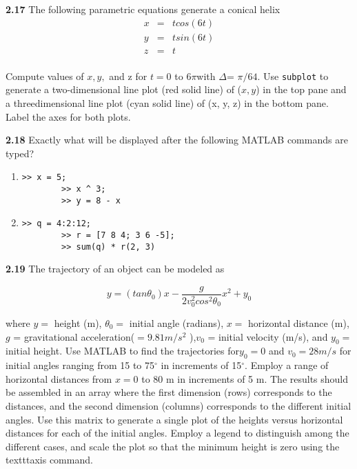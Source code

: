 \documentclass[../main.tex]{subfiles}
\begin{document}
\begin{multicols}{2}
\textbf{2.17} The following parametric equations generate a conical
helix
\[ \begin{array}{lll}
	x &= &t cos(6t)\\
	y &= &t sin(6t)\\
	z &= &t\\

	
\end{array} \]

Compute values of $x, y,$ and z for $t = 0$ to $6\pi $with
$\Delta $= $\pi/64$. Use \texttt{subplot} to generate a two-dimensional
line plot (red solid line) of ($x, y$) in the top pane and a threedimensional line plot (cyan solid line) of (x, y, z) in the
bottom pane. Label the axes for both plots.


\textbf{2.18} Exactly what will be displayed after the following
MATLAB commands are typed?
\begin{enumerate}[label=(\alph*)]
		

	\item 
	\begin{lstlisting}[frame=none, numbers=none]
		>> x = 5;
		>> x ^ 3;
		>> y = 8 - x
	\end{lstlisting}
	\item 
	\begin{lstlisting}[frame=none, numbers=none]
		>> q = 4:2:12;
		>> r = [7 8 4; 3 6 -5];
		>> sum(q) * r(2, 3) 
	\end{lstlisting}
\end{enumerate}

\textbf{2.19} The trajectory of an object can be modeled as

$$y=(tan\theta_0  )x-\dfrac{g}{2v_0^2cos^2\theta_0 }x^2+y_0$$


where $y =$ height (m), $\theta_0 =$ initial angle (radians), $x =$
horizontal distance (m), $g$ = gravitational acceleration($= 9.81 m/s^2$
),$ v_0$ = initial velocity (m/s), and $y_0 =$ initial
height. Use MATLAB to find the trajectories for$ y_0 = 0$ and
$v_0 = 28 m/s$ for initial angles ranging from 15 to 75$^{\circ}$ in increments of 15$^{\circ}$. Employ a 
range of horizontal distances
from $x = 0$ to 80 m in increments of 5 m. The results should
be assembled in an array where the first dimension (rows)
corresponds to the distances, and the second dimension
(columns) corresponds to the different initial angles. Use
this matrix to generate a single plot of the heights versus
horizontal distances for each of the initial angles. Employ a
legend to distinguish among the different cases, and scale
the plot so that the minimum height is zero using the texttt{axis}
command.


\end{multicols}
\end{document}

